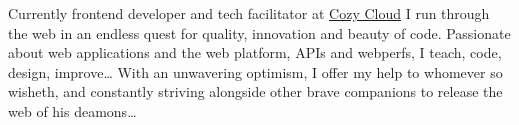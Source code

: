 
\begin{cvparagraph}
  Currently frontend developer and tech facilitator at \href{https://cozy.io/}{Cozy Cloud} I run through the web in an endless quest for quality, innovation and beauty of code. Passionate about web applications and the web platform, APIs and webperfs, I teach, code, design, improve…
  With an unwavering optimism, I offer my help to whomever so wisheth, and constantly striving alongside other brave companions to release the web of his deamons…
\end{cvparagraph}
